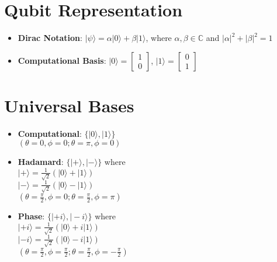 \begin{multicols}{3}

\section*{Qubit Representation}
\begin{itemize}[leftmargin=*,nosep,topsep=0pt]
    \item \textbf{Dirac Notation}: $|\psi\rangle = \alpha|0\rangle + \beta|1\rangle$, where $\alpha,\beta \in \mathbb{C}$ and $|\alpha|^2 + |\beta|^2 = 1$
    \item \textbf{Computational Basis}: $|0\rangle = \begin{bmatrix} 1 \\ 0 \end{bmatrix}$, $|1\rangle = \begin{bmatrix} 0 \\ 1 \end{bmatrix}$
\end{itemize}

\section*{Universal Bases}
\begin{itemize}[leftmargin=*,nosep,topsep=0pt]
    \item \textbf{Computational}: $\{|0\rangle, |1\rangle\}$ \\
        $(\theta=0, \phi=0; \theta=\pi, \phi=0)$
    \item \textbf{Hadamard}: $\{|+\rangle, |-\rangle\}$ where\\
        $|+\rangle = \frac{1}{\sqrt{2}}(|0\rangle + |1\rangle)$\\
        $|-\rangle = \frac{1}{\sqrt{2}}(|0\rangle - |1\rangle)$\\
        $(\theta=\frac{\pi}{2}, \phi=0; \theta=\frac{\pi}{2}, \phi=\pi)$
    \item \textbf{Phase}: $\{|+i\rangle, |-i\rangle\}$ where\\
        $|+i\rangle = \frac{1}{\sqrt{2}}(|0\rangle + i|1\rangle)$\\
        $|-i\rangle = \frac{1}{\sqrt{2}}(|0\rangle - i|1\rangle)$\\
        $(\theta=\frac{\pi}{2}, \phi=\frac{\pi}{2}; \theta=\frac{\pi}{2}, \phi=-\frac{\pi}{2})$
\end{itemize}


\end{multicols}
